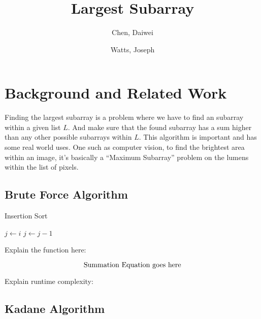 \documentclass[10pt, letterpaper]{article}
\title{Largest Subarray}
\author{
  Chen, Daiwei \\
  \and
  Watts, Joseph
}
\begin{document}
	\maketitle
	\begin{abstract}

	\end{abstract}
	\section{Background and Related Work}
  Finding the largest subarray is a problem where we have to find an subarray within a given list $L$. And make sure that the found subarray has a sum higher than any other possible subarrays within $L$.
  This algorithm is important and has some real world uses. One such as computer vision, to find the brightest area within an image, it's basically a ``Maximum Subarray'' problem on the lumens within the list of pixels.

	\subsection{Brute Force Algorithm}

	\begin{algorithm}
	\begin{algorithmic}
		\caption{Insertion Sort}\label{inssort}
	\State $j\gets i$
	\State $j\gets j-1$
	\EndWhile
	\EndFor
	\EndFunction
	\end{algorithmic}
	\end{algorithm}

  Explain the function here:

	\[
	\textnormal{Summation Equation goes here}
	\]

  Explain runtime complexity:

	\subsection{Kadane Algorithm}
\end{document}
